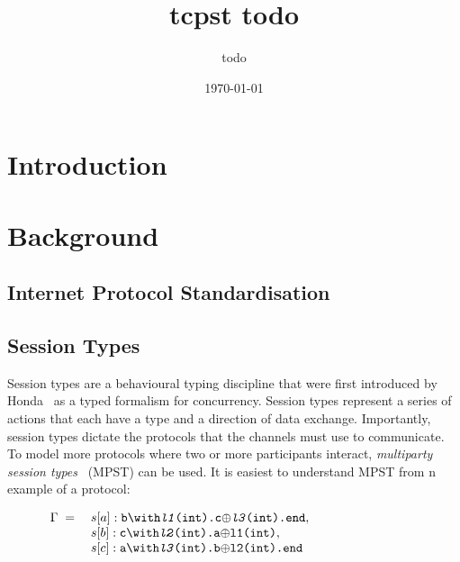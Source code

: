 \documentclass{article}
\title{tcpst todo}
\author{todo}
\date{\today}
\newcommand{\type}[1]{\texttt{#1}}
\begin{document}
\maketitle

\section{Introduction}

\section{Background}

\subsection{Internet Protocol Standardisation}

\subsection{Session Types}

Session types are a behavioural typing discipline that were first introduced by Honda~\cite{H93} as a typed formalism for concurrency.
Session types represent a series of actions that each have a type and a direction of data exchange.
Importantly, session types dictate the protocols that the channels must use to communicate.
To model more protocols where two or more participants interact, \textit{multiparty session types}~\cite{SY19} (MPST) can be used. 
It is easiest to understand MPST from n example of a protocol:

\begin{figure}[H]
    \centering
$
    \begin{array}{rl}
        \textbf{\ensuremath{\Gamma}} \; = \;  & s[a]:\type{b\ensuremath{\with}\textit{l1}(int).c\ensuremath{\oplus}\textit{l3}(int).end}, \cr
        & s[b]:\type{c\ensuremath{\with}\textit{l2}(int).a\ensuremath{\oplus}l1(int)}, \cr
        & s[c]:\type{a\ensuremath{\with}\textit{l3}(int).b\ensuremath{\oplus}l2(int).end}
    \end{array}
$
\end{figure}
\end{document}
